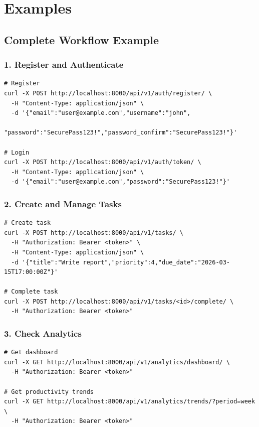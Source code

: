 \documentclass[11pt,a4paper]{article}
\begin{document}
\section{Examples}

\subsection{Complete Workflow Example}

\subsubsection{1. Register and Authenticate}

\begin{lstlisting}[style=bash]
# Register
curl -X POST http://localhost:8000/api/v1/auth/register/ \
  -H "Content-Type: application/json" \
  -d '{"email":"user@example.com","username":"john",
       "password":"SecurePass123!","password_confirm":"SecurePass123!"}'

# Login
curl -X POST http://localhost:8000/api/v1/auth/token/ \
  -H "Content-Type: application/json" \
  -d '{"email":"user@example.com","password":"SecurePass123!"}'
\end{lstlisting}

\subsubsection{2. Create and Manage Tasks}

\begin{lstlisting}[style=bash]
# Create task
curl -X POST http://localhost:8000/api/v1/tasks/ \
  -H "Authorization: Bearer <token>" \
  -H "Content-Type: application/json" \
  -d '{"title":"Write report","priority":4,"due_date":"2026-03-15T17:00:00Z"}'

# Complete task
curl -X POST http://localhost:8000/api/v1/tasks/<id>/complete/ \
  -H "Authorization: Bearer <token>"
\end{lstlisting}

\subsubsection{3. Check Analytics}

\begin{lstlisting}[style=bash]
# Get dashboard
curl -X GET http://localhost:8000/api/v1/analytics/dashboard/ \
  -H "Authorization: Bearer <token>"

# Get productivity trends
curl -X GET http://localhost:8000/api/v1/analytics/trends/?period=week \
  -H "Authorization: Bearer <token>"
\end{lstlisting}
\end{document}
